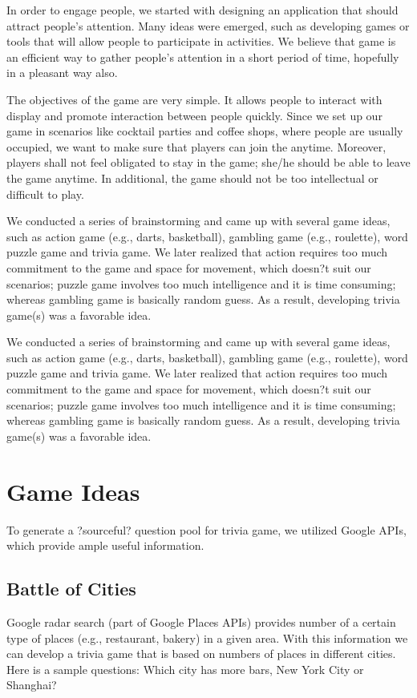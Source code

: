 \documentclass{sig-alternate}
\begin{document}
In order to engage people, we started with designing an application that should attract 
people's attention. Many ideas were emerged, such as developing games or tools that 
will allow people to participate in activities. We believe that game is an efficient way to 
gather people's attention in a short period of time, hopefully in a pleasant way also.

The objectives of the game are very simple. It allows people to interact with display and 
promote interaction between people quickly. Since we set up our game in scenarios like 
cocktail parties and coffee shops, where people are usually occupied, we want to make 
sure that players can join the anytime. Moreover, players shall not feel obligated to stay in 
the game; she/he should be able to leave the game anytime. In additional, the game 
should not be too intellectual or difficult to play.

We conducted a series of brainstorming and came up with several game ideas, such as 
action game (e.g., darts, basketball), gambling game (e.g., roulette), word puzzle game 
and trivia game. We later realized that action requires too much commitment to the game 
and space for movement, which doesn?t suit our scenarios; puzzle game involves too 
much intelligence and it is time consuming; whereas gambling game is basically random 
guess. As a result, developing trivia game(s) was a favorable idea.

We conducted a series of brainstorming and came up with several game ideas, such 
as action game (e.g., darts, basketball), gambling game (e.g., roulette), word puzzle game 
and trivia game. We later realized that action requires too much commitment to the game 
and space for movement, which doesn?t suit our scenarios; puzzle game involves too much 
intelligence and it is time consuming; whereas gambling game is basically random guess. 
As a result, developing trivia game(s) was a favorable idea.

\section{Game Ideas}
To generate a ?sourceful? question pool for trivia game, we utilized Google APIs, which 
provide ample useful information.

\subsection{Battle of Cities}
Google radar search (part of Google Places APIs) provides number of a certain type of places 
(e.g., restaurant, bakery) in a given area. With this information we can develop a trivia game 
that is based on numbers of places in different cities. Here is a sample questions: Which city 
has more bars, New York City or Shanghai?
\end{document}
